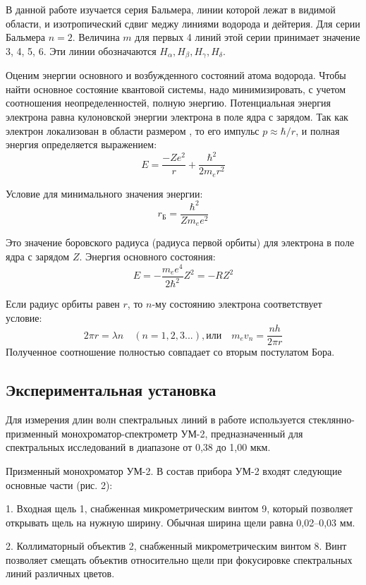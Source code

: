 \documentclass[a4paper,12pt]{article}
\begin{document}
В данной работе изучается серия Бальмера, линии которой лежат в видимой области, и изотропический сдвиг меджу линиями водорода и дейтерия. Для серии Бальмера $n=2$. Величина $m$ для первых 4 линий этой серии принимает значение 3, 4, 5, 6. Эти линии обозначаются $H_\alpha, H_\beta, H_\gamma, H_\delta$.

Оценим энергии основного и возбужденного состояний атома водорода. Чтобы найти основное состояние квантовой системы, надо минимизировать, с учетом соотношения
неопределенностей, полную энергию. Потенциальная энергия электрона равна кулоновской энергии электрона в поле ядра с зарядом. Так как электрон локализован в области размером , то его импульс $p\approx\hbar/r$, и полная энергия определяется выражением:
\begin{equation}
    E=\frac{-Ze^2}{r}+\frac{\hbar^2}{2m_er^2}
\end{equation}

Условие для минимального значения энергии:
\begin{equation}
    r_\text{Б} = \frac{\hbar^2}{Zm_ee^2}
\end{equation}


Это значение боровского радиуса (радиуса первой орбиты) для электрона в поле ядра с зарядом $Z$. Энергия основного состояния:
\begin{equation}
    E=-\frac{m_ee^4}{2\hbar^2}Z^2=-RZ^2
\end{equation}

Если радиус орбиты равен $r$, то $n$-му состоянию электрона соответствует условие:
$$
2\pi r=\lambda n \quad (n=1,2,3...), \text{или} \quad m_ev_n=\frac{nh}{2\pi r}
$$
Полученное соотношение полностью совпадает со вторым постулатом Бора.

\subsection{Экспериментальная установка}

Для измерения длин волн спектральных линий в работе используется стеклянно-призменный монохроматор-спектрометр УМ-2, предназначенный для спектральных исследований в диапазоне от 0,38 до 1,00 мкм.

Призменный монохроматор УМ-2. В состав прибора УМ-2 входят следующие основные части (рис. 2):

1. Входная щель 1, снабженная микрометрическим винтом 9, который позволяет открывать щель на нужную ширину. Обычная ширина щели равна 0,02--0,03 мм.

2. Коллиматорный объектив 2, снабженный микрометрическим винтом 8. Винт позволяет смещать объектив относительно щели при фокусировке спектральных линий различных цветов.
\end{document}
